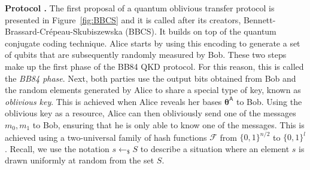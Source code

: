 \noindent\textbf{Protocol \cite{BBCS92}.} The first proposal of a quantum oblivious transfer protocol is presented in Figure~\ref{fig:BBCS} and it is called after its creators, Bennett-Brassard-Cr{\'e}peau-Skubiszewska (BBCS). It builds on top of the quantum conjugate coding technique. Alice starts by using this encoding to generate a set of qubits that are subsequently randomly measured by Bob. These two steps make up the first phase of the BB84 QKD protocol. For this reason, this is called the \textit{BB84 phase}. Next, both parties use the output bits obtained from Bob and the random elements generated by Alice to share a special type of key, known as \textit{oblivious key}. This is achieved when Alice reveals her bases $\bm{\theta}^{\mathsf{A}}$ to Bob. Using the oblivious key as a resource, Alice can then obliviously send one of the messages $m_0, m_1$ to Bob, ensuring that he is only able to know one of the messages. This is achieved using a two-universal family of hash functions $\mathcal{F}$ from $\{0,1\}^{n/2}$ to $\{0,1\}^{l}$. Recall, we use the notation $s\leftarrow_{\$}S$ to describe a situation where an element $s$ is drawn uniformly at random from the set $S$.

